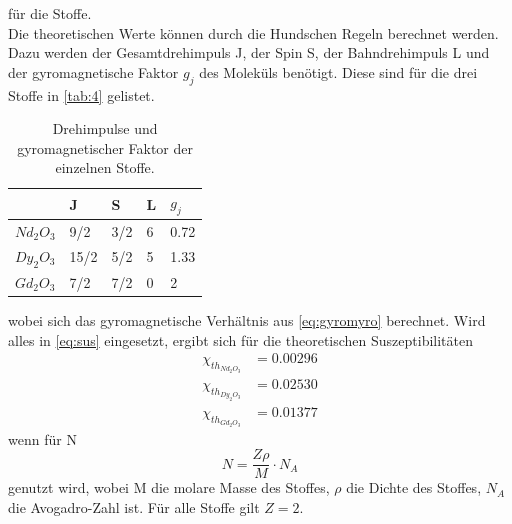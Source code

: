 für die Stoffe.\\
Die theoretischen Werte können durch die Hundschen Regeln berechnet werden. Dazu werden der Gesamtdrehimpuls J, der Spin S, der Bahndrehimpuls L und der gyromagnetische Faktor $g_j$ des Moleküls benötigt. Diese sind für die drei Stoffe in \autoref{tab:4} gelistet.
\begin{table}[H]
  \centering
  \caption{Drehimpulse und gyromagnetischer Faktor der einzelnen Stoffe.}
  \begin{tabular}{l|l|l|l|l}
   & J & S & L & $g_j$\\ \hline
   $Nd_2 O_3$ & 9/2 & 3/2 & 6 & 0.72\\ \hline
   $Dy_2 O_3$ & 15/2 & 5/2 & 5 & 1.33\\ \hline
   $Gd_2 O_3$ & 7/2 & 7/2 & 0 & 2\\ \hline
   \end{tabular}
   \label{tab:4}
\end{table}
wobei sich das gyromagnetische Verhältnis aus \autoref{eq:gyromyro} berechnet. 
Wird alles in \autoref{eq:sus} eingesetzt, ergibt sich für die theoretischen Suszeptibilitäten
\begin{align*}
  \chi_{th_{Nd_2 O_3}}&=0.00296\\
  \chi_{th_{Dy_2 O_3}}&=0.02530\\
  \chi_{th_{Gd_2 O_3}}&=0.01377
\end{align*}
wenn für N %
\begin{equation*}
  N=\frac{Z\rho}{M}\cdot N_{A}
\end{equation*}
genutzt wird, wobei M die molare Masse des Stoffes, $\rho$ die Dichte des Stoffes, $N_A$ die Avogadro-Zahl ist. Für alle Stoffe gilt $Z=2$.


%
%
%
%
%
%
